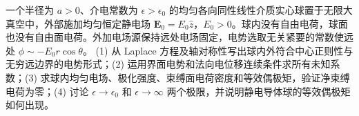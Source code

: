 一个半径为 \(a>0\)、介电常数为 \(\epsilon>\epsilon_0\) 的均匀各向同性线性介质实心球置于无限大真空中，外部施加均匀恒定静电场 \(\boldsymbol E_0=E_0\hat z\)，\(E_0>0\)。球内没有自由电荷，球面也没有自由面电荷。外加电场源保持远处电场固定，电势选取无关紧要的常数使远处 \(\phi\sim-E_0r\cos\theta\)。
(1) 从 Laplace 方程及轴对称性写出球内外符合中心正则性与无穷远边界的电势形式；(2) 运用界面电势和法向电位移连续条件求所有未知系数；(3) 求球内均匀电场、极化强度、束缚面电荷密度和等效偶极矩，验证净束缚电荷为零；(4) 讨论 \(\epsilon\to\epsilon_0\) 和 \(\epsilon\to\infty\) 两个极限，并说明静电导体球的等效偶极矩如何出现。
